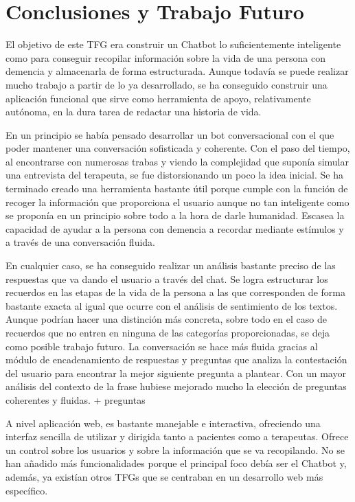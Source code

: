 \chapter{Conclusiones y Trabajo Futuro}
\label{cap:conclusiones}

El objetivo de este TFG era construir un Chatbot lo suficientemente inteligente como para conseguir recopilar información sobre la vida de una persona con demencia y almacenarla de forma estructurada. Aunque todavía se puede realizar mucho trabajo a partir de lo ya desarrollado, se ha conseguido construir una aplicación funcional que sirve como herramienta de apoyo, relativamente autónoma, en la dura tarea de redactar una historia de vida. 

En un principio se había pensado desarrollar un bot conversacional con el que poder mantener una conversación sofisticada y coherente. Con el paso del tiempo, al encontrarse con numerosas trabas y viendo la complejidad que suponía simular una entrevista del terapeuta, se fue distorsionando un poco la idea inicial. Se ha terminado creado una herramienta bastante útil porque cumple con la función de recoger la información que proporciona el usuario aunque no tan inteligente como se proponía en un principio sobre todo a la hora de darle humanidad. Escasea la capacidad de ayudar a la persona con demencia a recordar mediante estímulos y a través de una conversación fluida. 

En cualquier caso, se ha conseguido realizar un análisis bastante preciso de las respuestas que va dando el usuario a través del chat. Se logra estructurar los recuerdos en las etapas de la vida de la persona a las que corresponden de forma bastante exacta al igual que ocurre con el análisis de sentimiento de los textos. Aunque podrían hacer una distinción más concreta, sobre todo en el caso de recuerdos que no entren en ninguna de las categorías proporcionadas, se deja como posible trabajo futuro. La conversación se hace más fluida gracias al módulo de encadenamiento de respuestas y preguntas que analiza la contestación del usuario para encontrar la mejor siguiente pregunta a plantear. Con un mayor análisis del contexto de la frase hubiese mejorado mucho la elección de preguntas coherentes y fluidas.  + preguntas

A nivel aplicación web, es bastante manejable e interactiva, ofreciendo una interfaz sencilla de utilizar y  dirigida tanto a pacientes como a terapeutas. Ofrece un control sobre los usuarios y sobre la información que se va recopilando. No se han añadido más funcionalidades porque el principal foco debía ser el Chatbot y, además, ya existían otros TFGs que se centraban en un desarrollo web más específico. 

